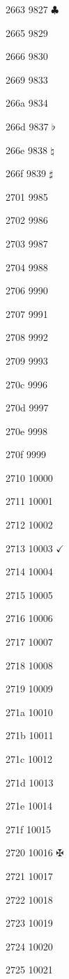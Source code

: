 \documentclass[11pt]{article}
\begin{document}
2663 9827 \ensuremath{\clubsuit}

2665 9829 

2666 9830 

2669 9833 \quarternote

266a 9834 \eighthnote

266d 9837 \ensuremath{\flat}

266e 9838 \ensuremath{\natural}

266f 9839 \ensuremath{\sharp}

2701 9985 

2702 9986 

2703 9987 

2704 9988 

2706 9990 

2707 9991 

2708 9992 

2709 9993 

270c 9996 

270d 9997 

270e 9998 

270f 9999 

2710 10000 

2711 10001 

2712 10002 

2713 10003 \ensuremath{\checkmark}

2714 10004 

2715 10005 

2716 10006 

2717 10007 

2718 10008 

2719 10009 

271a 10010 

271b 10011 

271c 10012 

271d 10013 

271e 10014 

271f 10015 

2720 10016 \ensuremath{\maltese}

2721 10017 

2722 10018 

2723 10019 

2724 10020 

2725 10021 
\end{document}

